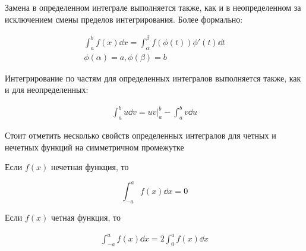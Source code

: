 
Замена в определенном интеграле выполняется также, как и в неопределенном за
исключением смены пределов интегрирования. Более формально:

\begin{align*}
  \int_{a}^{b} f(x) \dd x = \int_{\alpha}^{\beta} f(\phi(t)) \phi'(t) \dd t \\
  \phi(\alpha) = a, \phi(\beta) = b
\end{align*}

Интегрирование по частям для определенных интегралов выполняется также, как и
для неопределенных:

\begin{align*}
  \int_{a}^{b} u \dd v = u v \bigg\vert_{a}^{b} - \int_{a}^{b} v \dd u
\end{align*}

Стоит отметить несколько свойств определенных интегралов для четных и нечетных
функций на симметричном промежутке

\begin{multicols}{2}
  \begin{lemma}
    Если \(f(x)\) нечетная функция, то

    \begin{equation*}
      \int_{-a}^{a} f(x) \dd x = 0
    \end{equation*}
  \end{lemma}
  
  \begin{lemma}
    Если \(f(x)\) четная функция, то
    
    \begin{align*}
      \int_{-a}^{a} f(x) \dd x = 2 \int_{0}^{a} f(x) \dd x
    \end{align*}
  \end{lemma}  
\end{multicols}



